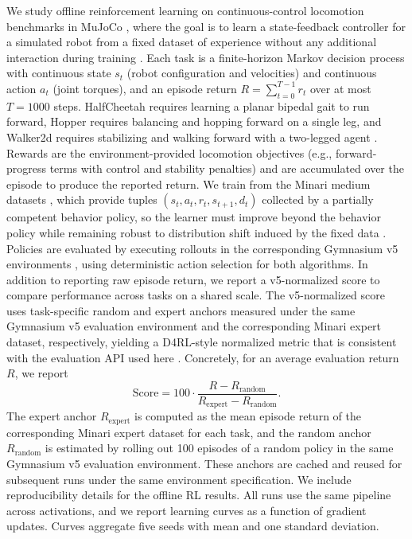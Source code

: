 \documentclass{article}
\theoremstyle{plain}
\theoremstyle{definition}
\theoremstyle{remark}
\begin{document}
We study offline reinforcement learning on continuous-control locomotion benchmarks in MuJoCo \cite{todorov2012mujoco}, where the goal is to learn a state-feedback controller for a simulated robot from a fixed dataset of experience without any additional interaction during training \cite{fu2020d4rl}. Each task is a finite-horizon Markov decision process with continuous state $s_t$ (robot configuration and velocities) and continuous action $a_t$ (joint torques), and an episode return $R=\sum_{t=0}^{T-1} r_t$ over at most $T=1000$ steps. HalfCheetah requires learning a planar bipedal gait to run forward, Hopper requires balancing and hopping forward on a single leg, and Walker2d requires stabilizing and walking forward with a two-legged agent \cite{todorov2012mujoco}. Rewards are the environment-provided locomotion objectives (e.g., forward-progress terms with control and stability penalties) and are accumulated over the episode to produce the reported return. We train from the Minari medium datasets \cite{minari}, which provide tuples $(s_t,a_t,r_t,s_{t+1},d_t)$ collected by a partially competent behavior policy, so the learner must improve beyond the behavior policy while remaining robust to distribution shift induced by the fixed data \cite{fu2020d4rl}. Policies are evaluated by executing rollouts in the corresponding Gymnasium v5 environments \cite{gymnasium}, using deterministic action selection for both algorithms.
In addition to reporting raw episode return, we report a v5-normalized score to compare performance across tasks on a shared scale. The v5-normalized score uses task-specific random and expert anchors measured under the same Gymnasium v5 evaluation environment and the corresponding Minari expert dataset, respectively, yielding a D4RL-style normalized metric that is consistent with the evaluation API used here \cite{fu2020d4rl}. Concretely, for an average evaluation return $R$, we report
\[
\mathrm{Score} = 100 \cdot \frac{R - R_{\mathrm{random}}}{R_{\mathrm{expert}} - R_{\mathrm{random}}}.
\]
The expert anchor $R_{\mathrm{expert}}$ is computed as the mean episode return of the corresponding Minari expert dataset for each task, and the random anchor $R_{\mathrm{random}}$ is estimated by rolling out 100 episodes of a random policy in the same Gymnasium v5 evaluation environment. These anchors are cached and reused for subsequent runs under the same environment specification. We include reproducibility details for the offline RL results. All runs use the same pipeline across activations, and we report learning curves as a function of gradient updates. Curves aggregate five seeds with mean and one standard deviation.
\end{document}
